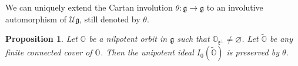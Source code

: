 \documentclass[11pt, a4paper]{amsart}
\newcommand{\C}{\mathbb{C}}
\newcommand{\orb}{\mathbb{O}}
\newcommand{\gr}{\operatorname{gr}}
\newcommand{\fg}{\mathfrak{g}}
\newcommand{\fk}{\mathfrak{k}}
\newcommand{\cU}{\mathcal{U}}
\newcommand{\Ug}{\cU\fg}
\newcommand{\cm}{\C^\times}
\newtheorem{Thm}{Theorem}[subsection]
\newtheorem{Prop}[Thm]{Proposition}
\theoremstyle{definition}
\numberwithin{equation}{section}
\begin{document}

We can uniquely extend the Cartan involution $\theta: \fg \to \fg$ to an involutive automorphism of $\Ug$, still denoted by $\theta$.

\begin{Prop}\label{prop:unipotent_theta_stable}
	Let $\orb$ be a nilpotent orbit in $\fg$ such that $\orb_{\fk^\perp} \neq \varnothing$.
	Let $\widetilde{\orb}$ be any finite connected cover of $\orb$. Then the unipotent ideal $I_0(\widetilde{\orb})$ is preserved by $\theta$. 
\end{Prop}
\end{document}
